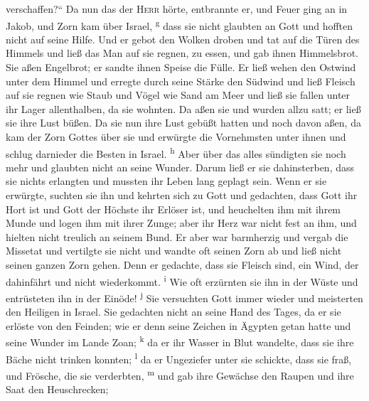 verschaffen?{}``  Da nun das der \textsc{Herr} hörte,
entbrannte er, und Feuer ging an in Jakob, und Zorn kam über Israel,
\textsuperscript{g}  dass sie nicht glaubten an Gott und
hofften nicht auf seine Hilfe.  Und er gebot den Wolken
droben und tat auf die Türen des Himmels  und ließ das
Man auf sie regnen, zu essen, und gab ihnen Himmelsbrot. 
Sie aßen Engelbrot; er sandte ihnen Speise die Fülle.  Er
ließ wehen den Ostwind unter dem Himmel und erregte durch seine Stärke
den Südwind  und ließ Fleisch auf sie regnen wie Staub
und Vögel wie Sand am Meer  und ließ sie fallen unter ihr
Lager allenthalben, da sie wohnten.  Da aßen sie und
wurden allzu satt; er ließ sie ihre Lust büßen.  Da sie
nun ihre Lust gebüßt hatten und noch davon aßen,  da kam
der Zorn Gottes über sie und erwürgte die Vornehmsten unter ihnen und
schlug darnieder die Besten in Israel. \textsuperscript{h}
 Aber über das alles sündigten sie noch mehr und glaubten
nicht an seine Wunder.  Darum ließ er sie dahinsterben,
dass sie nichts erlangten und mussten ihr Leben lang geplagt sein.
 Wenn er sie erwürgte, suchten sie ihn und kehrten sich
zu Gott  und gedachten, dass Gott ihr Hort ist und Gott
der Höchste ihr Erlöser ist,  und heuchelten ihm mit
ihrem Munde und logen ihm mit ihrer Zunge;  aber ihr Herz
war nicht fest an ihm, und hielten nicht treulich an seinem Bund.
 Er aber war barmherzig und vergab die Missetat und
vertilgte sie nicht und wandte oft seinen Zorn ab und ließ nicht seinen
ganzen Zorn gehen.  Denn er gedachte, dass sie Fleisch
sind, ein Wind, der dahinfährt und nicht wiederkommt.
\textsuperscript{i}  Wie oft erzürnten sie ihn in der
Wüste und entrüsteten ihn in der Einöde! \textsuperscript{j}
 Sie versuchten Gott immer wieder und meisterten den
Heiligen in Israel.  Sie gedachten nicht an seine Hand
des Tages, da er sie erlöste von den Feinden;  wie er
denn seine Zeichen in Ägypten getan hatte und seine Wunder im Lande
Zoan; \textsuperscript{k}  da er ihr Wasser in Blut
wandelte, dass sie ihre Bäche nicht trinken konnten; \textsuperscript{l}
 da er Ungeziefer unter sie schickte, dass sie fraß, und
Frösche, die sie verderbten, \textsuperscript{m}  und gab
ihre Gewächse den Raupen und ihre Saat den Heuschrecken;
